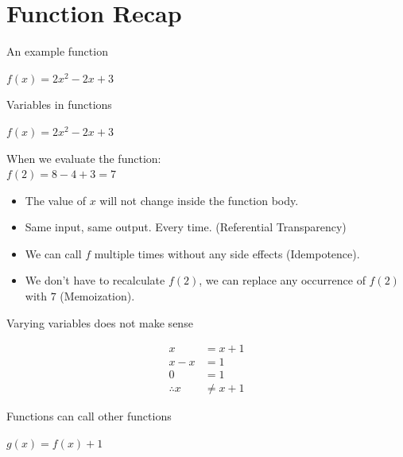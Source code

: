 \documentclass[mathserif]{beamer}
\begin{document}
\section{Function Recap}

\begin{frame}{An example function}

  {\Huge $f(x) = 2x^2 - 2x + 3$}


\end{frame}

\begin{frame}{Variables in functions}

  {\Huge $f(x) = 2x^2 - 2x + 3$}

  \vskip5mm

When we evaluate the function:\\
$f(2) = 8 - 4 + 3 = 7$

  \begin{itemize}[<+->]
    \item The value of $x$ will not change inside the function body.
    \item Same input, same output. Every time. (Referential Transparency)
    \item We can call $f$ multiple times without any side effects (Idempotence).
    \item We don't have to recalculate $f(2)$, we can replace any
      occurrence of $f(2)$ with $7$ (Memoization).
  \end{itemize}
\end{frame}

\begin{frame}{Varying variables does not make sense}

  {\Huge
    \begin{align*}
           x     & = x + 1\\
           x - x & = 1\\
           0     & = 1\\
\therefore x     & \neq x + 1
    \end{align*}
  }

\end{frame}

\begin{frame}{Functions can call other functions}

  {\Huge $g(x) = f(x) + 1$}

\end{frame}
\end{document}
